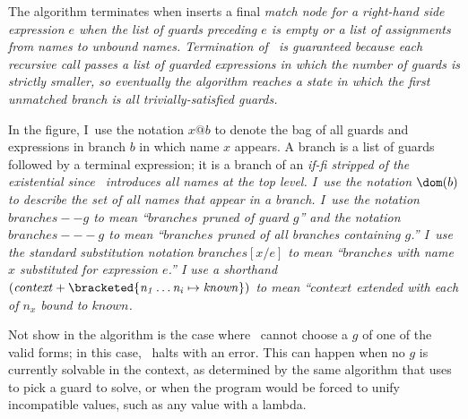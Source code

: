 \documentclass[manuscript,screen,review, 12pt, nonacm]{acmart}
\begin{document}
    The algorithm terminates when inserts a final \it{match} node for a
    right-hand side expression $e$ when the list of guards preceding $e$ is
    empty or a list of assignments from names to unbound names. Termination of
    \DTran\ is guaranteed because each recursive call passes a list of guarded
    expressions in which the number of guards is strictly smaller, so eventually
    the algorithm reaches a state in which the first unmatched branch is all
    trivially-satisfied guards. 

    In the figure, I~use the notation $x@b$ to denote the bag of all guards and
    expressions in branch $b$ in which name $x$ appears. A branch is a list of
    guards followed by a terminal expression; it is a branch of an \it{if-fi}
    stripped of the existential since \DTran\ introduces all names at the top
    level. I~use the notation $\dom(b)$ to describe the set of all names that
    appear in a branch. I~use the notation $\mathit{branches -- g}$ to mean
    “$\mathit{branches}$ pruned of guard $g$” and the notation $\mathit{branches
    --- g}$ to mean “$\mathit{branches}$ pruned of all \it{branches} containing
    $g$.” I~use the standard substitution notation $\mathit{branches[x/e]}$ to
    mean “$\mathit{branches}$ with name $x$ substituted for expression $e$.” I
    use a shorthand $\mathit{(context + \bracketed{n_1 \dots n_i \mapsto
    known})}$ to mean “$\mathit{context}$ extended with each of $n_x$ bound to
    $\mathit{known}$. 

    Not show in the algorithm is the case where \Compile\ cannot choose a $g$ of
    one of the valid forms; in this case, \Compile\ halts with an error. This
    can happen when no $g$ is currently solvable in the context, as determined
    by the same algorithm that \VMinus uses to pick a guard to solve, or when
    the program would be forced to unify incompatible values, such as any value
    with a lambda. 

       
\end{document}
